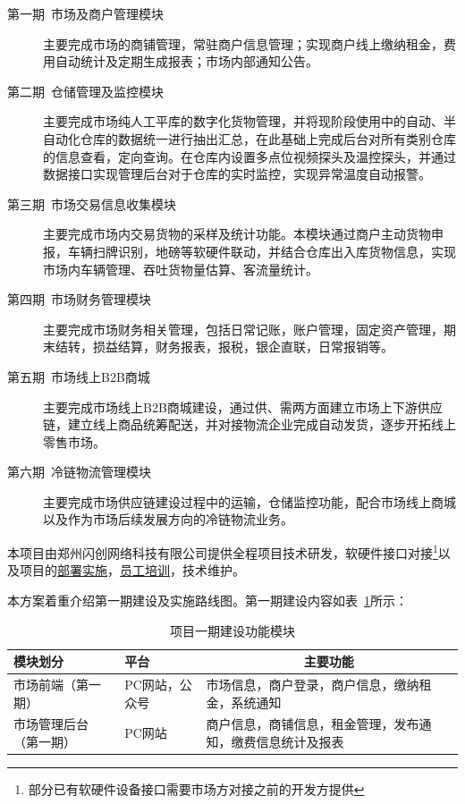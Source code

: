 \documentclass[12pt,a4paper,openany]{ctexrep}
\begin{document}
\begin{description}
\item[第一期\, 市场及商户管理模块]主要完成市场的商铺管理，常驻商户信息管理；实现商户线上缴纳租金，费用自动统计及定期生成报表；市场内部通知公告。\par
\item[第二期\, 仓储管理及监控模块]主要完成市场纯人工平库的数字化货物管理，并将现阶段使用中的自动、半自动化仓库的数据统一进行抽出汇总，在此基础上完成后台对所有类别仓库的信息查看，定向查询。在仓库内设置多点位视频探头及温控探头，并通过数据接口实现管理后台对于仓库的实时监控，实现异常温度自动报警。\par
\item[第三期\, 市场交易信息收集模块]主要完成市场内交易货物的采样及统计功能。本模块通过商户主动货物申报，车辆扫牌识别，地磅等软硬件联动，并结合仓库出入库货物信息，实现市场内车辆管理、吞吐货物量估算、客流量统计。
\item[第四期\, 市场财务管理模块]主要完成市场财务相关管理，包括日常记账，账户管理，固定资产管理，期末结转，损益结算，财务报表，报税，银企直联，日常报销等。
\item[第五期\, 市场线上B2B商城]主要完成市场线上B2B商城建设，通过供、需两方面建立市场上下游供应链，建立线上商品统筹配送，并对接物流企业完成自动发货，逐步开拓线上零售市场。
\item[第六期\, 冷链物流管理模块]主要完成市场供应链建设过程中的运输，仓储监控功能，配合市场线上商城以及作为市场后续发展方向的冷链物流业务。
\end{description}

本项目由郑州闪创网络科技有限公司提供全程项目技术研发，软硬件接口对接\footnote{部分已有软硬件设备接口需要市场方对接之前的开发方提供}以及项目的\hyperref[arrange]{部署实施}，\hyperref[arrange]{员工培训}，技术维护。

本方案着重介绍第一期建设及实施路线图。第一期建设内容如表~\ref{function}所示：

\begin{table}[htbp]
\begin{tabular*}{\hsize}{p{3cm}<{\centering}|p{3cm}<{\centering}|p{8cm}}
\hline
模块划分					&	平台				&	\multicolumn{1}{c}{主要功能}		\\
\hline
市场前端（第一期）		&	PC网站，公众号		&	市场信息，商户登录，商户信息，缴纳租金，系统通知		\\
\hline
市场管理后台（第一期）	&	PC网站				&	商户信息，商铺信息，租金管理，发布通知，缴费信息统计及报表		\\	
\hline
\end{tabular*}
\caption{项目一期建设功能模块}
\label{function}
\end{table}
\end{document}
